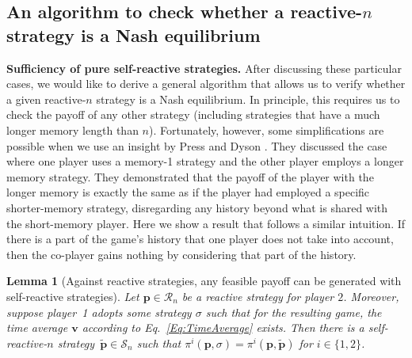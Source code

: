 \documentclass[11pt]{article}
\theoremstyle{plainCl1}
\newtheorem{lemma}{Lemma}
\theoremstyle{plainCl2}
\begin{document}

\subsection{An algorithm to check whether a reactive-$n$ strategy is a Nash equilibrium}
\label{Sec:Algorithm}

{\bf Sufficiency of pure self-reactive strategies.}
After discussing these particular cases, we would like to derive a general algorithm that allows us to verify whether a given reactive-$n$ strategy is a Nash equilibrium. 
In principle, this requires us to check the payoff of any other strategy (including strategies that have a much longer memory length than $n$). Fortunately, however, some simplifications are possible when we use an insight by Press and Dyson \cite{press:PNAS:2012}.
They discussed the case where one player uses a memory-1
strategy and the other player employs a longer memory strategy. They
demonstrated that the payoff of the player with the longer memory is exactly the
same as if the player had employed a specific shorter-memory strategy,
disregarding any history beyond what is shared with the short-memory player.
Here we show a result that follows a similar intuition. 
If there is a part of the game's history that one player does not take into account, then the co-player gains nothing by
considering that part of the history. 

\begin{lemma}[Against reactive strategies, any feasible payoff can be generated with self-reactive strategies] \label{lemma:self_reactive_sufficiency}
 Let $\mathbf{p}\!\in\!\mathcal{R}_n$ be a reactive strategy for player $2$. 
 Moreover, suppose player~1 adopts some strategy $\sigma$ such that for the resulting game, the time average $\mathbf{v}$ according to Eq.~\eqref{Eq:TimeAverage} exists. 
 Then there is a self-reactive-$n$ strategy~$\mathbf{\tilde p}\!\in\!\mathcal{S}_n$ such that $\pi^i(\mathbf{p},\sigma)\! = \!\pi^i(\mathbf{p},\mathbf{\tilde{p}})$ for $i\!\in\!\{1,2\}$.
\end{lemma}
\end{document}
